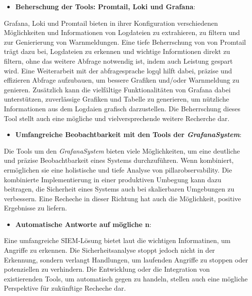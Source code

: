 \begin{itemize}[noitemsep]
    \item \textbf{Beherschung der Tools: Promtail, Loki und Grafana}:
\end{itemize}

Grafana, Loki und Promtail bieten in ihrer Konfiguration verschiedenen Möglichkeiten und Informationen von Logdateien zu extrahieren, zu filtern und zur Genierierung von Warnmeldungen. Eine tiefe Beherrschung von  von Promtail trägt dazu bei, Logdateien zu erkennen und wichtige Informtionen direkt zu filtern, ohne das weitere Abfrage notwendig ist, indem auch Leistung gespart wird. Eine Weiterarbeit mit der \gls{abfragesprache} \gls{logql} hilft dabei, präzise und effizieren Abfrage aufzubauen, um bessere Grafiken und/oder Warnmeldung zu genieren. Zusätzlich kann die vielfältige Funktionalitäten von Grafana dabei unterstützen, zuverlässige Grafiken und Tabelle zu generieren, um nützliche Informationen aus dem Logdaien grafisch darzustellen. Die Beherrschung dieses Tool stellt auch eine mögliche und vielversprechende weitere Recherche dar. 


\begin{itemize}[noitemsep]
    \item \textbf{Umfangreiche Beobachtbarkeit mit den Tools der \textit{\gls{GrafanaSystem}}}:
\end{itemize}

Die Tools um den \textit{\gls{GrafanaSystem}} bieten viele Möglichkeiten, um eine deutliche und präzise Beobachtbarkeit eines Systems durchzuführen. Wenn kombiniert, ermöglichen sie eine holistische und tiefe Analyse von \gls{pillarobservability}. Die kombinierte Implementierung in einer produktiven Umbegung kann dazu beitragen, die Sicherheit eines Systems auch bei skalierbaren Umgebungen zu verbessern. Eine Recheche in dieser Richtung hat auch die Möglichkeit, positive Ergebnisse zu liefern.


\begin{itemize}[noitemsep]
    \item \textbf{Automatische Antworte auf mögliche n}:
\end{itemize}

Eine umfangreiche \gls{SIEM}-Lösung bietet laut \cite{Mohammed_NOC} die wichtigen Informatinen, um Angriffe zu erkennen. Die Sicherheitsanalyse stoppt jedoch nicht in der Erkennung, sondern verlangt Handlungen, um laufenden Angriffe zu stoppen oder potenziellen zu verhindern. Die Entwicklung oder die Integration von existierenden Tools, um automatisch gegen  zu handeln, stellen auch eine mögliche Perspektive für zukünftige Recheche dar.

